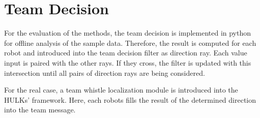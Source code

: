 \section{Team Decision}
\label{03_teamDecision}

For the evaluation of the methods, the team decision is implemented in
python for offline analysis of the sample data.
Therefore, the result is computed for each robot and introduced into
the team decision filter as direction ray. %
Each value input is paired with the other rays. If they cross, the
filter is updated with this intersection until all pairs of direction
rays are being considered.

For the real case, a team whistle localization module is
introduced into the HULKs' framework.
Here, each robots fills the result of the determined direction into
the team message.

